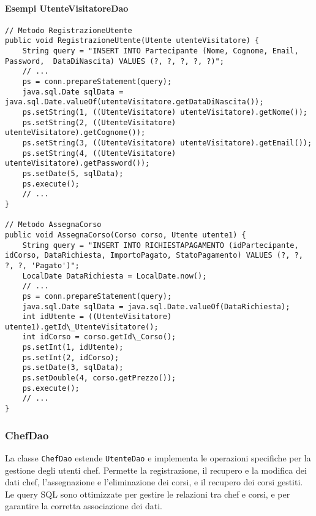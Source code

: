 \paragraph{Esempi UtenteVisitatoreDao}
\begin{verbatim}
// Metodo RegistrazioneUtente
public void RegistrazioneUtente(Utente utenteVisitatore) {
    String query = "INSERT INTO Partecipante (Nome, Cognome, Email, Password,  DataDiNascita) VALUES (?, ?, ?, ?, ?)";
    // ...
    ps = conn.prepareStatement(query);
    java.sql.Date sqlData = java.sql.Date.valueOf(utenteVisitatore.getDataDiNascita());
    ps.setString(1, ((UtenteVisitatore) utenteVisitatore).getNome());
    ps.setString(2, ((UtenteVisitatore) utenteVisitatore).getCognome());
    ps.setString(3, ((UtenteVisitatore) utenteVisitatore).getEmail());
    ps.setString(4, ((UtenteVisitatore) utenteVisitatore).getPassword());
    ps.setDate(5, sqlData);
    ps.execute();
    // ...
}

// Metodo AssegnaCorso
public void AssegnaCorso(Corso corso, Utente utente1) {
    String query = "INSERT INTO RICHIESTAPAGAMENTO (idPartecipante, idCorso, DataRichiesta, ImportoPagato, StatoPagamento) VALUES (?, ?, ?, ?, 'Pagato')";
    LocalDate DataRichiesta = LocalDate.now();
    // ...
    ps = conn.prepareStatement(query);
    java.sql.Date sqlData = java.sql.Date.valueOf(DataRichiesta);
    int idUtente = ((UtenteVisitatore) utente1).getId\_UtenteVisitatore();
    int idCorso = corso.getId\_Corso();
    ps.setInt(1, idUtente);
    ps.setInt(2, idCorso);
    ps.setDate(3, sqlData);
    ps.setDouble(4, corso.getPrezzo());
    ps.execute();
    // ...
}
\end{verbatim}

\subsubsection{ChefDao}
La classe \texttt{ChefDao} estende \texttt{UtenteDao} e implementa le operazioni specifiche per la gestione degli utenti chef. Permette la registrazione, il recupero e la modifica dei dati chef, l'assegnazione e l'eliminazione dei corsi, e il recupero dei corsi gestiti. Le query SQL sono ottimizzate per gestire le relazioni tra chef e corsi, e per garantire la corretta associazione dei dati.

